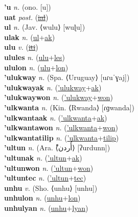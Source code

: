 \textbf{'u} \textit{n.} (ono. [u])
 \label{'u} \\
\textbf{uat} \textit{post.} (\hyperref[ial]{\sout{ial}})
 \label{uat} \\
\textbf{ul} \textit{n.} (Jav. ⟨wulu⟩ [wuɭu])
 \label{ul} \\
\textbf{ulak} \textit{n.} (\hyperref[ul]{ul}+\hyperref[ak]{ak})
 \label{ulak} \\
\textbf{ulu} \textit{v.} (\hyperref[iti]{\sout{iti}})
 \label{ulu} \\
\textbf{ulules} \textit{n.} (\hyperref[ulu]{ulu}+\hyperref[les]{les})
 \label{ulules} \\
\textbf{ululon} \textit{n.} (\hyperref[ulu]{ulu}+\hyperref[lon]{lon})
 \label{ululon} \\
\textbf{'ulukway} \textit{n.} (Spa. ⟨Uruguay⟩ [uɾuˈɣaj])
 \label{'ulukway} \\
\textbf{'ulukwayak} \textit{n.} (\hyperref['ulukway]{'ulukway}+\hyperref[ak]{ak})
 \label{'ulukwayak} \\
\textbf{'ulukwaywon} \textit{n.} (\hyperref['ulukway]{'ulukway}+\hyperref[won]{won})
 \label{'ulukwaywon} \\
\textbf{'ulkwanta} \textit{n.} (Kin. ⟨Rwanda⟩ [ɾɡwanda])
 \label{'ulkwanta} \\
\textbf{'ulkwantaak} \textit{n.} (\hyperref['ulkwanta]{'ulkwanta}+\hyperref[ak]{ak})
 \label{'ulkwantaak} \\
\textbf{'ulkwantawon} \textit{n.} (\hyperref['ulkwanta]{'ulkwanta}+\hyperref[won]{won})
 \label{'ulkwantawon} \\
\textbf{'ulkwantatilip} \textit{n.} (\hyperref['ulkwanta]{'ulkwanta}+\hyperref[tilip]{tilip})
 \label{'ulkwantatilip} \\
\textbf{'ultun} \textit{n.} (Ara. ⟨ْأُردن⟩ [ʔurdunn])
 \label{'ultun} \\
\textbf{'ultunak} \textit{n.} (\hyperref['ultun]{'ultun}+\hyperref[ak]{ak})
 \label{'ultunak} \\
\textbf{'ultunwon} \textit{n.} (\hyperref['ultun]{'ultun}+\hyperref[won]{won})
 \label{'ultunwon} \\
\textbf{'ultuntec} \textit{n.} (\hyperref['ultun]{'ultun}+\hyperref[tec]{tec})
 \label{'ultuntec} \\
\textbf{unhu} \textit{v.} (Sho. ⟨unhu⟩ [unhu])
 \label{unhu} \\
\textbf{unhulon} \textit{n.} (\hyperref[unhu]{unhu}+\hyperref[lon]{lon})
 \label{unhulon} \\
\textbf{unhulyan} \textit{n.} (\hyperref[unhu]{unhu}+\hyperref[lyan]{lyan})
